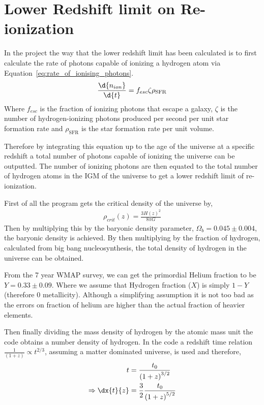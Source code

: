 
\section{Lower Redshift limit on Re-ionization} %
\label{sec:lower_redshift_limit_on_re-ionization}
	In the project the way that the lower redshift limit has been calculated is to first calculate the rate of photons capable of ionizing a hydrogen atom via Equation~\ref{eq:rate_of_ionising_photons}\cite{2010Natur.468...49R}.
	\begin{align}
		\frac{\d{n_{ion}}}{\d{t}}=f_{esc}\zeta\rho_\text{SFR}\label{eq:rate_of_ionising_photons}
	\end{align}
	Where $f_{esc}$ is the fraction of ionizing photons that escape a galaxy, $\zeta$ is the number of hydrogen-ionizing photons produced per second per unit star formation rate and $\rho_\text{SFR}$ is the star formation rate per unit volume.

	Therefore by integrating this equation up to the age of the universe at a specific redshift a total number of photons capable of ionizing the universe can be outputted. The number of ionizing photons are then equated to the total number of hydrogen atoms in the IGM of the universe to get a lower redshift limit of re-ionization.

	First of all the program gets the critical density of the universe by,
	\begin{align}
		\rho_{crit}(z)=\frac{3H{(z)}^{2}}{8\pi G}
	\end{align}
	Then by multiplying this by the baryonic density parameter, $\Omega_{b}=0.045\pm0.004$, the baryonic density is achieved. By then multiplying by the fraction of hydrogen, calculated from big bang nucleosynthesis, the total density of hydrogen in the universe can be obtained.

	From the 7 year WMAP survey\cite{2011ApJS..192...18K}, we can get the primordial Helium fraction to be $Y=0.33\pm0.09$. Where we assume that Hydrogen fraction ($X$) is simply $1-Y$ (therefore 0 metallicity). Although a simplifying assumption it is not too bad as the errors on fraction of helium are higher than the actual fraction of heavier elements.

	Then finally dividing the mass density of hydrogen by the atomic mass unit the code obtains a number density of hydrogen. In the code a redshift time relation $\frac{1}{(1+z)}\propto t^{2/3}$, assuming a matter dominated universe, is used and therefore,
	\begin{align}
		t &= \frac{t_{0}}{{(1+z)}^{3/2}} \\
		\Rightarrow \dx{t}{z} &= \frac{3}{2}\frac{t_{0}}{{(1+z)}^{5/2}}
	\end{align}

